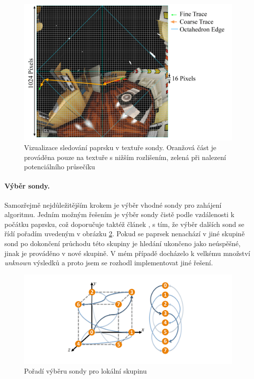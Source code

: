 \begin{figure}[H]
	\centering
	\includegraphics[scale=0.85]{images/lfp_trace.png}
	\caption{Vizualizace sledování paprsku v textuře sondy. Oranžová část je prováděna pouze na textuře s nižším rozlišením, zelená při nalezení potenciálního průsečíku}
	\label{fig:lfp_trace}
\end{figure}

\paragraph{Výběr sondy.} Samozřejmě nejdůležitějším krokem je výběr vhodné sondy pro zahájení algoritmu. Jedním možným řešením je výběr sondy čistě podle vzdálenosti k počátku paprsku, což doporučuje taktéž článek \cite{light_field_probes}, s tím, že výběr dalších sond se řídí pořadím uvedeným v obrázku \ref{fig:lfp_cube}. Pokud se paprsek nenachází v jiné skupině sond po dokončení průchodu této skupiny je hledání ukončeno jako neúspěšné, jinak je prováděno v nové skupině. V mém případě docházelo k velkému množství \textit{unknown} výsledků a proto jsem se rozhodl implementovat jiné řešení. 

\begin{figure}[H]
	\centering
	\includegraphics[scale=1]{images/probe_cube.png}
	\caption{Pořadí výběru sondy pro lokální skupinu}
	\label{fig:lfp_cube}
\end{figure}

